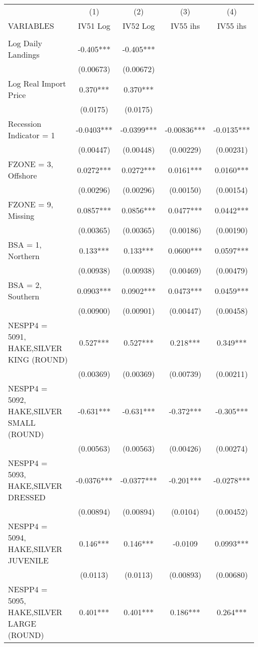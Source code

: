 \begin{tabular}{lcccc} \hline
 & (1) & (2) & (3) & (4) \\
VARIABLES & IV51 Log & IV52 Log & IV55 ihs & IV55 ihs \\ \hline
 &  &  &  &  \\
Log Daily Landings & -0.405*** & -0.405*** &  &  \\
 & (0.00673) & (0.00672) &  &  \\
Log Real Import Price & 0.370*** & 0.370*** &  &  \\
 & (0.0175) & (0.0175) &  &  \\
Recession Indicator = 1 & -0.0403*** & -0.0399*** & -0.00836*** & -0.0135*** \\
 & (0.00447) & (0.00448) & (0.00229) & (0.00231) \\
FZONE = 3, Offshore & 0.0272*** & 0.0272*** & 0.0161*** & 0.0160*** \\
 & (0.00296) & (0.00296) & (0.00150) & (0.00154) \\
FZONE = 9, Missing & 0.0857*** & 0.0856*** & 0.0477*** & 0.0442*** \\
 & (0.00365) & (0.00365) & (0.00186) & (0.00190) \\
BSA = 1, Northern & 0.133*** & 0.133*** & 0.0600*** & 0.0597*** \\
 & (0.00938) & (0.00938) & (0.00469) & (0.00479) \\
BSA = 2, Southern & 0.0903*** & 0.0902*** & 0.0473*** & 0.0459*** \\
 & (0.00900) & (0.00901) & (0.00447) & (0.00458) \\
NESPP4 = 5091, HAKE,SILVER KING (ROUND) & 0.527*** & 0.527*** & 0.218*** & 0.349*** \\
 & (0.00369) & (0.00369) & (0.00739) & (0.00211) \\
NESPP4 = 5092, HAKE,SILVER SMALL (ROUND) & -0.631*** & -0.631*** & -0.372*** & -0.305*** \\
 & (0.00563) & (0.00563) & (0.00426) & (0.00274) \\
NESPP4 = 5093, HAKE,SILVER DRESSED & -0.0376*** & -0.0377*** & -0.201*** & -0.0278*** \\
 & (0.00894) & (0.00894) & (0.0104) & (0.00452) \\
NESPP4 = 5094, HAKE,SILVER JUVENILE & 0.146*** & 0.146*** & -0.0109 & 0.0993*** \\
 & (0.0113) & (0.0113) & (0.00893) & (0.00680) \\
NESPP4 = 5095, HAKE,SILVER LARGE (ROUND) & 0.401*** & 0.401*** & 0.186*** & 0.264*** \\

\end{tabular}

